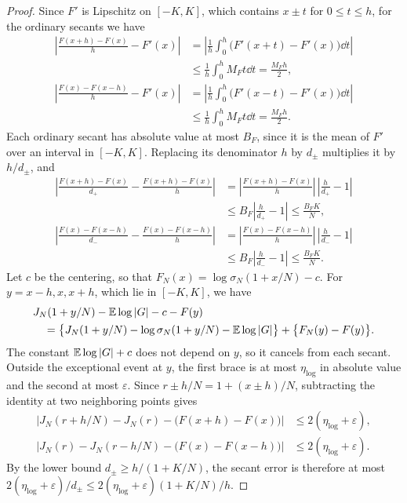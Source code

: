\begin{proof}
Since $F'$ is Lipschitz on $[-K,K]$, which contains $x\pm t$ for
$0\leq t\leq h$, for the ordinary secants we have
\begin{align*}
 \left|\frac{F(x+h)-F(x)}h-F'(x)\right|
 &=\left|\frac1h\int_0^h\bigl(F'(x+t)-F'(x)\bigr)\dd t\right|\\
 &\leq\frac1h\int_0^h M_Ft\dd t
 =\frac{M_Fh}2,\\
 \left|\frac{F(x)-F(x-h)}h-F'(x)\right|
 &=\left|\frac1h\int_0^h\bigl(F'(x-t)-F'(x)\bigr)\dd t\right|\\
 &\leq\frac1h\int_0^h M_Ft\dd t
 =\frac{M_Fh}2.
\end{align*}
Each ordinary secant has absolute value at most $B_F$, since it is the
mean of $F'$ over an interval in $[-K,K]$.
Replacing its denominator $h$ by $d_\pm$ multiplies it by $h/d_\pm$, and
\begin{align*}
 \left|\frac{F(x+h)-F(x)}{d_+}-\frac{F(x+h)-F(x)}h\right|
 &=\left|\frac{F(x+h)-F(x)}h\right|\,\left|\frac h{d_+}-1\right|\\
 &\leq B_F\left|\frac h{d_+}-1\right|
 \leq\frac{B_FK}N,\\
 \left|\frac{F(x)-F(x-h)}{d_-}-\frac{F(x)-F(x-h)}h\right|
 &=\left|\frac{F(x)-F(x-h)}h\right|\,\left|\frac h{d_-}-1\right|\\
 &\leq B_F\left|\frac h{d_-}-1\right|
 \leq\frac{B_FK}N.
\end{align*}
Let $c$ be the centering, so that $F_N(x)=\log\sigma_N(1+x/N)-c$.
For $y=x-h,x,x+h$, which lie in $[-K,K]$, we have
\begin{align*}
 &J_N(1+y/N)-\mathbb E\log|G|-c-F(y)\\
 &\quad=\bigl\{J_N(1+y/N)-\log\sigma_N(1+y/N)-\mathbb E\log|G|\bigr\}
        +\bigl\{F_N(y)-F(y)\bigr\}.
\end{align*}
The constant $\mathbb E\log|G|+c$ does not depend on $y$, so it cancels from
each secant. Outside the exceptional event at $y$, the first brace is at
most $\eta_{\log}$ in absolute value and the second at most
$\varepsilon$. Since $r\pm h/N=1+(x\pm h)/N$, subtracting the identity
at two neighboring points gives
\begin{align*}
 \bigl|J_N(r+h/N)-J_N(r)-\bigl(F(x+h)-F(x)\bigr)\bigr|
 &\leq2(\eta_{\log}+\varepsilon),\\
 \bigl|J_N(r)-J_N(r-h/N)-\bigl(F(x)-F(x-h)\bigr)\bigr|
 &\leq2(\eta_{\log}+\varepsilon).
\end{align*}
By the lower bound $d_\pm\geq h/(1+K/N)$, the secant error is therefore at
most $2(\eta_{\log}+\varepsilon)/d_\pm\leq2(\eta_{\log}+\varepsilon)(1+K/N)/h$.

\end{proof}

